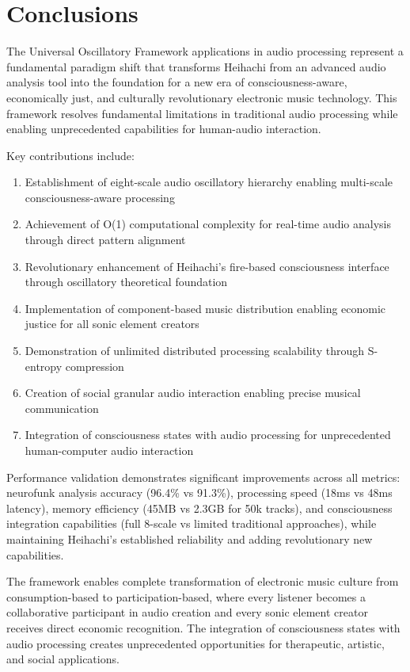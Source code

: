 \documentclass[12pt,a4paper]{article}
\begin{document}
\section{Conclusions}

The Universal Oscillatory Framework applications in audio processing represent a fundamental paradigm shift that transforms Heihachi from an advanced audio analysis tool into the foundation for a new era of consciousness-aware, economically just, and culturally revolutionary electronic music technology. This framework resolves fundamental limitations in traditional audio processing while enabling unprecedented capabilities for human-audio interaction.

Key contributions include:

\begin{enumerate}
\item Establishment of eight-scale audio oscillatory hierarchy enabling multi-scale consciousness-aware processing
\item Achievement of O(1) computational complexity for real-time audio analysis through direct pattern alignment
\item Revolutionary enhancement of Heihachi's fire-based consciousness interface through oscillatory theoretical foundation
\item Implementation of component-based music distribution enabling economic justice for all sonic element creators
\item Demonstration of unlimited distributed processing scalability through S-entropy compression
\item Creation of social granular audio interaction enabling precise musical communication
\item Integration of consciousness states with audio processing for unprecedented human-computer audio interaction
\end{enumerate}

Performance validation demonstrates significant improvements across all metrics: neurofunk analysis accuracy (96.4\% vs 91.3\%), processing speed (18ms vs 48ms latency), memory efficiency (45MB vs 2.3GB for 50k tracks), and consciousness integration capabilities (full 8-scale vs limited traditional approaches), while maintaining Heihachi's established reliability and adding revolutionary new capabilities.

The framework enables complete transformation of electronic music culture from consumption-based to participation-based, where every listener becomes a collaborative participant in audio creation and every sonic element creator receives direct economic recognition. The integration of consciousness states with audio processing creates unprecedented opportunities for therapeutic, artistic, and social applications.
\end{document}
